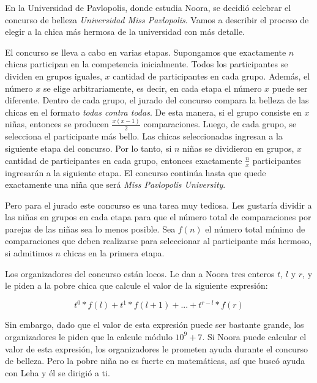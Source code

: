\documentclass[12pt]{article}
\newcommand{\nl}{\vspace{0.3cm}}
\begin{document}
En la Universidad de Pavlopolis, donde estudia Noora, se decidió celebrar el concurso de belleza \textit{Universidad Miss Pavlopolis}. Vamos a describir el proceso de elegir a la chica más hermosa de la universidad con más detalle.

\nl

El concurso se lleva a cabo en varias etapas. Supongamos que exactamente $n$ chicas participan en la competencia inicialmente. Todos los participantes se dividen en grupos iguales, $x$ cantidad de participantes en cada grupo. Además, el número $x$ se elige arbitrariamente, es decir, en cada etapa el número $x$ puede ser diferente. Dentro de cada grupo, el jurado del concurso compara la belleza de las chicas en el formato \textit{todas contra todas}. De esta manera, si el grupo consiste en $x$ niñas, entonces se producen $\frac{x(x-1)}{2}$ comparaciones. Luego, de cada grupo, se selecciona el participante más bello. Las chicas seleccionadas ingresan a la siguiente etapa del concurso. Por lo tanto, si $n$ niñas se dividieron en grupos, $x$ cantidad de participantes en cada grupo, entonces exactamente $\frac{n}{x}$ participantes ingresarán a la siguiente etapa. El concurso continúa hasta que quede exactamente una niña que será \textit{Miss Pavlopolis University}.

\nl

Pero para el jurado este concurso es una tarea muy tediosa. Les gustaría dividir a las niñas en grupos en cada etapa para que el número total de comparaciones por parejas de las niñas sea lo menos posible. Sea $f(n)$ el número total mínimo de comparaciones que deben realizarse para seleccionar al participante más hermoso, si admitimos $n$ chicas en la primera etapa.

\nl

Los organizadores del concurso están locos. Le dan a Noora tres enteros $t$, $l$ y $r$, y le piden a la pobre chica que calcule el valor de la siguiente expresión:

$$ t^0 * f(l) + t^1 * f(l + 1) + ... + t^{r - l} * f(r) $$

\nl

Sin embargo, dado que el valor de esta expresión puede ser bastante grande, los organizadores le piden que la calcule módulo $10^9 + 7$. Si Noora puede calcular el valor de esta expresión, los organizadores le prometen ayuda durante el concurso de belleza. Pero la pobre niña no es fuerte en matemáticas, así que buscó ayuda con Leha y él se dirigió a ti.

\nl
\end{document}
